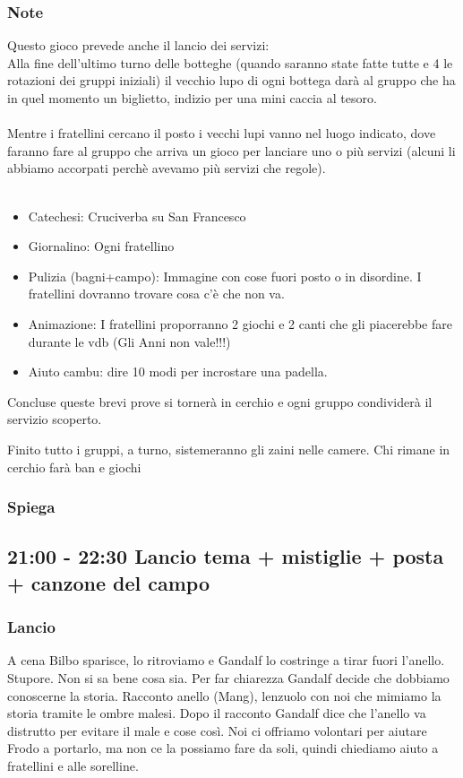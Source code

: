 \documentclass[../main.tex]{subfiles}
\begin{document}
        \subsubsection{Note}
        \label{sec:note}
        Questo gioco prevede anche il
        lancio dei servizi:\\
        Alla fine dell'ultimo turno delle botteghe (quando saranno state fatte tutte e 4 le rotazioni dei gruppi iniziali) il vecchio lupo di ogni bottega darà al gruppo che ha in quel momento un biglietto, indizio per una mini caccia al tesoro.\\
        \\
        Mentre i fratellini cercano il posto i vecchi lupi vanno nel luogo indicato, dove faranno fare al gruppo che arriva un gioco per lanciare uno o più servizi (alcuni li abbiamo accorpati perchè avevamo più servizi che regole).\\
        \\
        \begin{itemize}
            \item Catechesi: Cruciverba su San Francesco
            \item Giornalino: Ogni fratellino
            \item Pulizia (bagni+campo): Immagine con cose fuori posto o in disordine. I fratellini dovranno trovare cosa c'è che non va.
            \item Animazione: I fratellini proporranno 2 giochi e 2 canti che gli piacerebbe fare durante le vdb (Gli Anni non vale!!!)
            \item Aiuto cambu: dire 10 modi per incrostare una padella.
        \end{itemize}
        
        Concluse queste brevi prove si tornerà in cerchio e ogni gruppo condividerà il servizio scoperto.
        
        Finito tutto i gruppi, a turno, sistemeranno gli zaini nelle camere. Chi rimane in cerchio farà ban e giochi
        \subsubsection{Spiega}
        
    \subsection{21:00 - 22:30 Lancio tema + mistiglie + posta + canzone del campo}
    \subsubsection{Lancio}
    A cena Bilbo sparisce, lo ritroviamo e Gandalf lo costringe a tirar fuori l’anello. Stupore. Non si sa bene cosa sia. Per far chiarezza Gandalf decide che dobbiamo conoscerne la storia. Racconto  anello (Mang), lenzuolo con noi che mimiamo la storia tramite le ombre malesi. Dopo il racconto Gandalf dice che l’anello va distrutto per evitare il male e cose così. Noi ci offriamo volontari per aiutare Frodo a portarlo, ma non ce la possiamo fare da soli, quindi chiediamo aiuto a fratellini e alle sorelline. 
\end{document}
